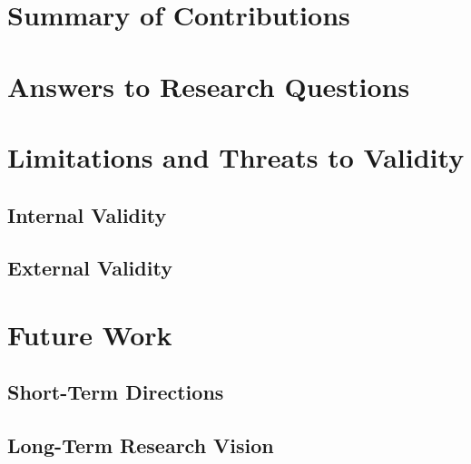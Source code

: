 \section{Summary of Contributions}
\label{sec:summary-contributions}

\section{Answers to Research Questions}
\label{sec:research-answers}

\section{Limitations and Threats to Validity}
\label{sec:threats}

    \subsection{Internal Validity}
    \label{subsec:internal-validity}

    \subsection{External Validity}
    \label{subsec:external-validity}

\section{Future Work}
\label{sec:future-work}

    \subsection{Short-Term Directions}
    \label{subsec:short-term}

    \subsection{Long-Term Research Vision}
    \label{subsec:long-term}